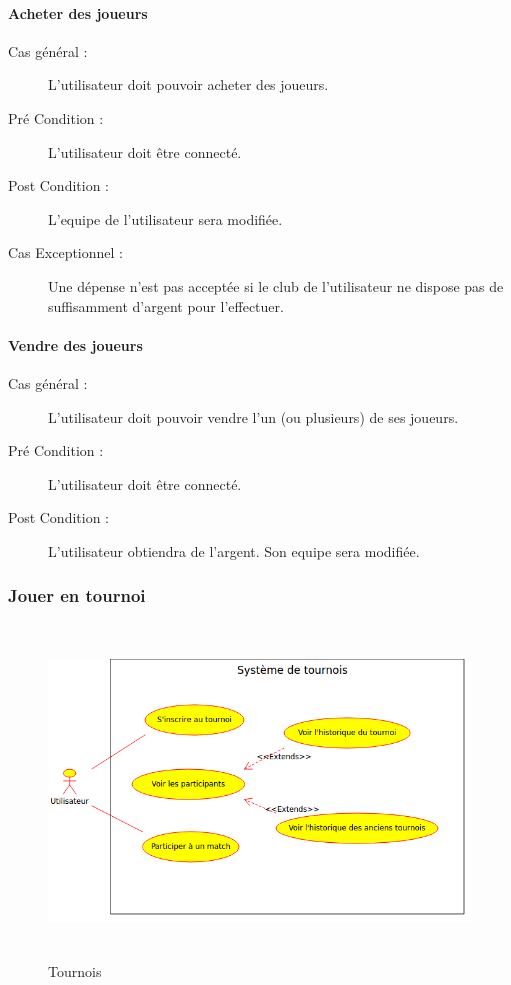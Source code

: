 \documentclass[a4paper]{article}
\begin{document}
\paragraph{Acheter des \glspl{joueur}}
\begin{description}
    \item[Cas général :] L'\gls{utilisateur} doit pouvoir acheter des \glspl{joueur}.
    \item[Pré Condition  :] L'\gls{utilisateur} doit être connecté.
    \item[Post Condition :] L'\gls{equipe} de l'\gls{utilisateur} sera modifiée.
    \item[Cas Exceptionnel :] Une dépense n'est pas acceptée si le \gls{club} de l'\gls{utilisateur} ne dispose pas de suffisamment d'argent pour l'effectuer.
\end{description}
\paragraph{Vendre des \glspl{joueur}}
\begin{description}
    \item[Cas général :] L'\gls{utilisateur} doit pouvoir vendre l'un (ou plusieurs) de ses \glspl{joueur}.
    \item[Pré Condition  :] L'\gls{utilisateur} doit être connecté.
    \item[Post Condition :] L'\gls{utilisateur} obtiendra de l'argent. Son \gls{equipe} sera modifiée.
\end{description}

\subsubsection{Jouer en tournoi}
\begin{figure}[h]
   \caption{\label{1} Tournois}
   \begin{center}
   \includegraphics[height=250pt]{uml/usrTournoi.png}
   \end{center}
\end{figure}
\end{document}
